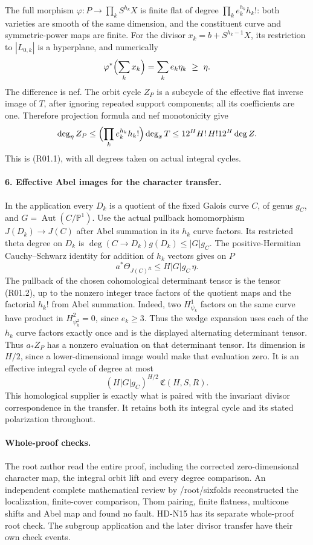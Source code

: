 The full morphism
$\varphi:P\to\prod_kS^{h_k}X$ is finite flat of degree
$\prod_ke_k^{h_k}h_k!$: both varieties are smooth of the same
dimension, and the constituent curve and symmetric-power maps are
finite. For the divisor $x_k=b+S^{h_k-1}X$, its restriction to
$|L_{0,k}|$ is a hyperplane, and numerically
\[
       \varphi^*\Bigl(\sum_kx_k\Bigr)
             =\sum_ke_k\eta_k\ \ge\ \eta.
\]
The difference is nef. The orbit cycle $Z_P$ is a subcycle of the
effective flat inverse image of $T$, after ignoring repeated support
components; all its coefficients are one. Therefore projection formula
and nef monotonicity give
\[
 \deg_\eta Z_P
 \le\Bigl(\prod_ke_k^{h_k}h_k!\Bigr)\deg_xT
 \le12^HH!\,H!12^H\deg Z.
\]
This is (R01.1), with all degrees taken on actual integral cycles.

\paragraph{6. Effective Abel images for the character transfer.}
In the application every $D_k$ is a quotient of the fixed Galois
curve $C$, of genus $g_C$, and $G=\operatorname{Aut}(C/\mathbb P^1)$.
Use the actual pullback homomorphism $J(D_k)\to J(C)$ after Abel
summation in its $h_k$ curve factors. Its restricted theta degree
on $D_k$ is $\deg(C\to D_k)g(D_k)\le |G|g_C$.
The positive-Hermitian Cauchy--Schwarz identity for addition of
$h_k$ vectors gives on $P$
\[
 a^*\Theta_{J(C)^R}\le H|G|g_C\,\eta.
\]
The pullback of the chosen cohomological determinant tensor is
the tensor (R01.2), up to the nonzero integer trace factors of the
quotient maps and the factorial $h_k!$ from Abel summation. Indeed,
two $H^1_{\psi_k}$ factors on the same curve have product in
$H^2_{\psi_k^2}=0$, since $e_k\ge3$. Thus the wedge expansion
uses each of the $h_k$ curve factors exactly once and is the displayed
alternating determinant tensor. Thus $a_*Z_P$ has a nonzero evaluation on that
determinant tensor. Its dimension is $H/2$, since a lower-dimensional
image would make that evaluation zero. It is an effective integral
cycle of degree at most
\begin{equation}
      (H|G|g_C)^{H/2}\,\mathfrak C(H,S,R).           \tag{R01.7}
\end{equation}
This homological supplier is exactly what is paired with the invariant
divisor correspondence in the transfer. It retains both its integral
cycle and its stated polarization throughout.

\paragraph{Whole-proof checks.}
The root author read the entire proof, including the corrected
zero-dimensional character map, the integral orbit lift and every
degree comparison. An independent complete mathematical review by
/root/sixfolds reconstructed the localization, finite-cover comparison,
Thom pairing, finite flatness, multicone shifts and Abel map and found
no fault. HD-N15 has its separate whole-proof root check. The subgroup
application and the later divisor transfer have their own check events.
